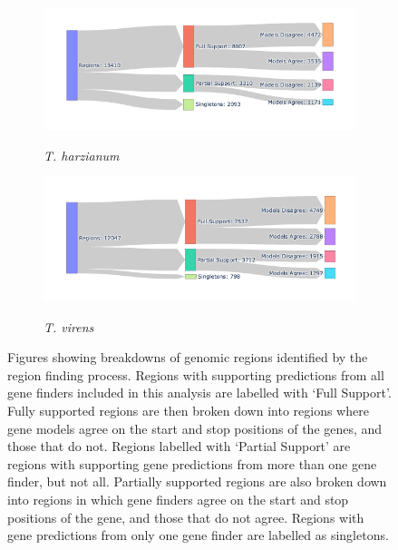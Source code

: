 \begin{figure}[h!]
  \ContinuedFloat
  \centering
  \begin{subfigure}{0.9\textwidth}
    \includegraphics[width=\textwidth]{figures/t-harzianum-region-breakdown.png}
    \label{fig:t-harzianum-regions}
    \caption{\textit{T. harzianum}}
  \end{subfigure}
  \begin{subfigure}{0.9\textwidth}
    \includegraphics[width=\textwidth]{figures/t-virens-region-breakdown.png}
    \label{fig:t-virens-regions}
    \caption{\textit{T. virens}}
  \end{subfigure}
  \caption[Breakdown of identified regions]{Figures showing breakdowns
    of genomic regions identified by the region finding
    process. Regions with supporting predictions from all gene finders
    included in this analysis are labelled with `Full Support'. Fully
    supported regions are then broken down into regions where gene
    models agree on the start and stop positions of the genes, and
    those that do not. Regions labelled with `Partial Support' are
    regions with supporting gene predictions from more than one gene
    finder, but not all. Partially supported regions are also broken
    down into regions in which gene finders agree on the start and
    stop positions of the gene, and those that do not agree. Regions
    with gene predictions from only one gene finder are labelled as
    singletons.}
  \label{fig:regions-sankey}
\end{figure}

